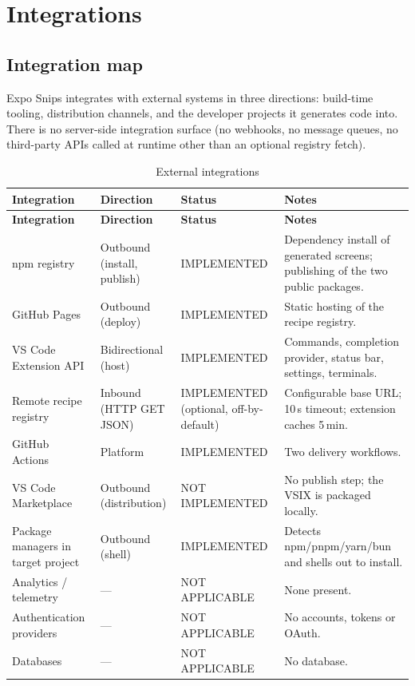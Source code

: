 \chapter{Integrations}
\label{ch:integrations}

\section{Integration map}

Expo Snips integrates with external systems in three directions: build-time
tooling, distribution channels, and the developer projects it generates code
into. There is no server-side integration surface (no webhooks, no message
queues, no third-party APIs called at runtime other than an optional registry
fetch).

\begin{longtable}{@{}L{3.1cm}L{2.2cm}L{3.2cm}L{5.6cm}@{}}
\caption{External integrations}\\
\toprule
\textbf{Integration} & \textbf{Direction} & \textbf{Status} & \textbf{Notes} \\
\midrule
\endfirsthead
\toprule
\textbf{Integration} & \textbf{Direction} & \textbf{Status} & \textbf{Notes} \\
\midrule
\endhead
npm registry & Outbound (install, publish) & IMPLEMENTED & Dependency install of
generated screens; publishing of the two public packages. \\
GitHub Pages & Outbound (deploy) & IMPLEMENTED & Static hosting of the recipe
registry. \\
VS Code Extension API & Bidirectional (host) & IMPLEMENTED & Commands, completion
provider, status bar, settings, terminals. \\
Remote recipe registry & Inbound (HTTP GET JSON) & IMPLEMENTED (optional,
off-by-default) & Configurable base URL; 10\,s timeout; extension caches 5\,min. \\
GitHub Actions & Platform & IMPLEMENTED & Two delivery workflows. \\
VS Code Marketplace & Outbound (distribution) & NOT IMPLEMENTED & No publish step;
the VSIX is packaged locally. \\
Package managers in target project & Outbound (shell) & IMPLEMENTED & Detects
npm/pnpm/yarn/bun and shells out to install. \\
Analytics / telemetry & --- & NOT APPLICABLE & None present. \\
Authentication providers & --- & NOT APPLICABLE & No accounts, tokens or OAuth. \\
Databases & --- & NOT APPLICABLE & No database. \\
\bottomrule
\end{longtable}

